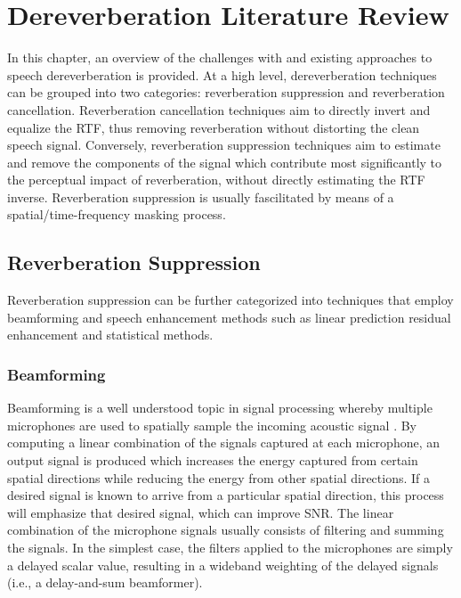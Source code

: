 \chapter{Dereverberation Literature Review}

In this chapter, an overview of the challenges with and existing approaches to speech dereverberation is provided. At a high level, dereverberation techniques can be grouped into two categories: reverberation suppression and reverberation cancellation. Reverberation cancellation techniques aim to directly invert and equalize the RTF, thus removing reverberation without distorting the clean speech signal. Conversely, reverberation suppression techniques aim to estimate and remove the components of the signal which contribute most significantly to the perceptual impact of reverberation, without directly estimating the RTF inverse. Reverberation suppression is usually fascilitated by means of a spatial/time-frequency masking process.



\section{Reverberation Suppression}

Reverberation suppression can be further categorized into techniques that employ beamforming and speech enhancement methods such as linear prediction residual enhancement and statistical methods.

\subsection{Beamforming}

Beamforming is a well understood topic in signal processing whereby multiple microphones are used to spatially sample the incoming acoustic signal \citep{elko1996microphone, van1988beamforming, flanagan1985computer}. By computing a linear combination of the signals captured at each microphone, an output signal is produced which increases the energy captured from certain spatial directions while reducing the energy from other spatial directions. If a desired signal is known to arrive from a particular spatial direction, this process will emphasize that desired signal, which can improve SNR. The linear combination of the microphone signals usually consists of filtering and summing the signals. In the simplest case, the filters applied to the microphones are simply a delayed scalar value, resulting in a wideband weighting of the delayed signals (i.e., a delay-and-sum beamformer). 

